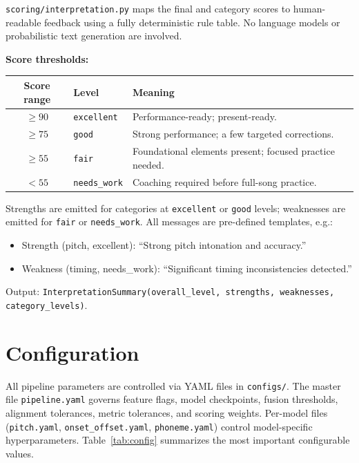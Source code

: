 \documentclass[11pt,letterpaper]{article}
\begin{document}
\texttt{scoring/interpretation.py} maps the final and category scores to
human-readable feedback using a fully deterministic rule table.
No language models or probabilistic text generation are involved.

\textbf{Score thresholds:}
\begin{center}
  \begin{tabular}{@{}clp{7cm}@{}}
    \toprule
    Score range & Level & Meaning \\
    \midrule
    $\ge 90$ & \texttt{excellent}  & Performance-ready; present-ready. \\
    $\ge 75$ & \texttt{good}       & Strong performance; a few targeted corrections. \\
    $\ge 55$ & \texttt{fair}       & Foundational elements present; focused practice needed. \\
    $< 55$   & \texttt{needs\_work} & Coaching required before full-song practice. \\
    \bottomrule
  \end{tabular}
\end{center}

Strengths are emitted for categories at \texttt{excellent} or \texttt{good}
levels; weaknesses are emitted for \texttt{fair} or \texttt{needs\_work}.
All messages are pre-defined templates, e.g.:
\begin{itemize}[noitemsep]
  \item Strength (pitch, excellent): ``Strong pitch intonation and accuracy.''
  \item Weakness (timing, needs\_work): ``Significant timing inconsistencies
        detected.''
\end{itemize}

Output: \texttt{InterpretationSummary(overall\_level, strengths, weaknesses,
category\_levels)}.

\section{Configuration}

All pipeline parameters are controlled via YAML files in \texttt{configs/}.
The master file \texttt{pipeline.yaml} governs feature flags, model
checkpoints, fusion thresholds, alignment tolerances, metric tolerances, and
scoring weights.
Per-model files (\texttt{pitch.yaml}, \texttt{onset\_offset.yaml},
\texttt{phoneme.yaml}) control model-specific hyperparameters.
Table~\ref{tab:config} summarizes the most important configurable values.
\end{document}
